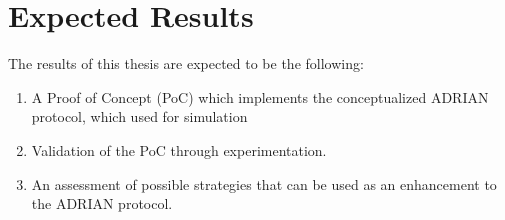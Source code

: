 \section{Expected Results} \label{sec:expected-results}
The results of this thesis are expected to be the following: 

\begin{enumerate}
    \item A Proof of Concept (PoC) which implements the conceptualized ADRIAN protocol, which used for simulation 
    \item Validation of the PoC through experimentation.
    \item An assessment of possible strategies that can be used as an enhancement to the ADRIAN protocol.
\end{enumerate}